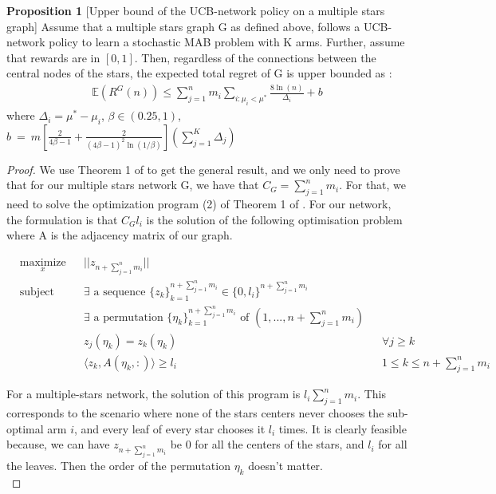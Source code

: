 \documentclass{article}
\begin{document}
\textbf{Proposition 1} [Upper bound of the UCB-network policy on a multiple stars graph] Assume that  a multiple stars graph G as defined above, follows a UCB-network policy to learn a stochastic MAB problem with K arms. Further, assume that rewards are in $[0, 1]$. Then, regardless of the connections between the central nodes of the stars, the expected total regret of G is upper bounded as : 
\begin{align*}
\mathbb{E}(R^G(n)) \leq \sum_{j=1}^n m_i \sum_{i:\mu_i< \mu^*} \frac{8\ln(n)}{\Delta_i}  + b
\end{align*} 
where $\Delta_i = \mu^* - \mu_i$, $\beta \in (0.25,1)$, $b~=~m \left[ \frac{2}{4\beta -1} + \frac{2}{(4\beta-1)^2 \ln(1/\beta)} \right] \left( \sum\limits_{j=1}^K \Delta_j \right)$

\begin{proof}

We use Theorem 1 of \cite{DBLP:journals/corr/KollaJG16} to get the general result, and we only need to prove that for our multiple stars network G, we have that $C_G = \sum_{j=1}^n m_i$. For that, we need to solve the optimization program (2) of Theorem 1 of \cite{DBLP:journals/corr/KollaJG16}. For our network, the formulation is that $C_Gl_i$ is the solution of the following optimisation problem where A is the adjacency matrix of our graph.

\begin{equation*}
\begin{aligned}
& \underset{x}{\text{maximize}}
&& ||z_{n + \sum_{j=1}^n m_i}|| 
&&& \\
& \text{subject to}
&& \exists\text{ a sequence }\{z_k\}_{k=1}^{n + \sum_{j=1}^n m_i} \in \{0, l_i\}^{n + \sum_{j=1}^n m_i}
&&& \\
& 
&& \exists\text{ a permutation }\{\eta_k\}_{k=1}^{n + \sum_{j=1}^n m_i} \text{ of } (1, ..., n + \sum_{j=1}^n m_i)
&&& \\
& 
&& z_j(\eta_k) = z_k(\eta_k) 
&&& \forall j \geq k \\
&
&& \langle z_k, A(\eta_k, :)\rangle \geq l_i
&&& 1\leq k \leq n + \sum_{j=1}^n m_i
\end{aligned}
\end{equation*}

For a multiple-stars network, the solution of this program is $l_i \sum_{j=1}^n m_i$. This corresponds to the scenario where none of the stars centers never chooses the sub-optimal arm $i$, and every leaf of every star chooses it $l_i$ times. It is clearly feasible because, we can have $z_{n + \sum_{j=1}^n m_i}$ be 0 for all the centers of the stars, and $l_i$ for all the leaves. Then the order of the permutation $\eta_k$ doesn't matter.  \\


\end{proof}
\end{document}
